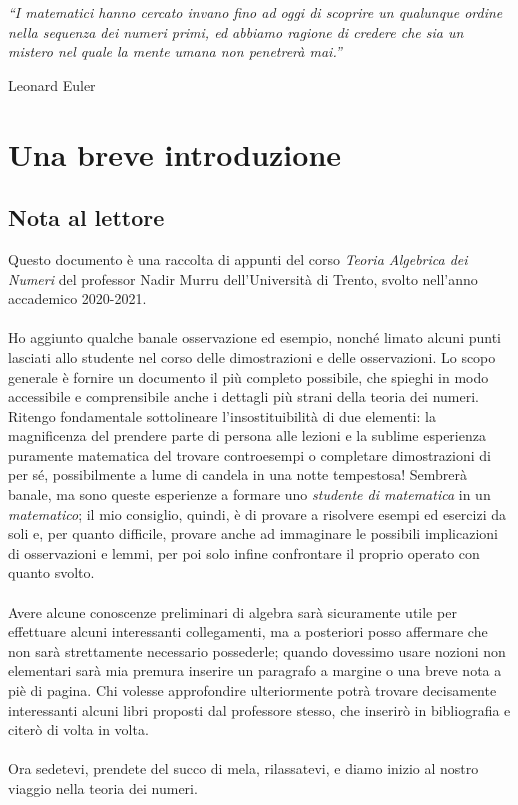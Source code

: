\documentclass[a4paper,twoside]{book}
\begin{document}
	\frontmatter
	
	\setcounter{page}{1}
	\title{}
	\author{Leonardo Errati}
	\maketitle
	
	\tableofcontents
	\newpage
	\epigraph{\textit{\enquote{I matematici hanno cercato invano fino ad oggi di scoprire un qualunque ordine nella sequenza dei numeri primi, ed abbiamo ragione di credere che sia un mistero nel quale la mente umana non penetrerà mai.}}}{Leonard Euler}
	
	\chapter{Una breve introduzione}
	\section*{Nota al lettore}
	Questo documento è una raccolta di appunti del corso \textit{Teoria Algebrica dei Numeri} del professor Nadir Murru dell'Università di Trento, svolto nell'anno accademico 2020-2021. \\ \\ 
	Ho aggiunto qualche banale osservazione ed esempio, nonché limato alcuni punti lasciati allo studente nel corso delle dimostrazioni e delle osservazioni. Lo scopo generale è fornire un documento il più completo possibile, che spieghi in modo accessibile e comprensibile anche i dettagli più strani della teoria dei numeri. \\ Ritengo fondamentale sottolineare l'insostituibilità di due elementi: la magnificenza del prendere parte di persona alle lezioni e la sublime esperienza puramente matematica del trovare controesempi o completare dimostrazioni di per sé, possibilmente a lume di candela in una notte tempestosa! Sembrerà banale, ma sono queste esperienze a formare uno \textit{studente di matematica} in un \textit{matematico}; il mio consiglio, quindi, è di provare a risolvere esempi ed esercizi da soli e, per quanto difficile, provare anche ad immaginare le possibili implicazioni di osservazioni e lemmi, per poi solo infine confrontare il proprio operato con quanto svolto. \\ \\ 
	Avere alcune conoscenze preliminari di algebra sarà sicuramente utile per effettuare alcuni interessanti collegamenti, ma a posteriori posso affermare che non sarà strettamente necessario possederle; quando dovessimo usare nozioni non elementari sarà mia premura inserire un paragrafo a margine o una breve nota a piè di pagina. Chi volesse approfondire ulteriormente potrà trovare decisamente interessanti alcuni libri proposti dal professore stesso, che inserirò in bibliografia e citerò di volta in volta.\\ \\ 
	Ora sedetevi, prendete del succo di mela, rilassatevi, e diamo inizio al nostro viaggio nella teoria dei numeri.
	
\end{document}

